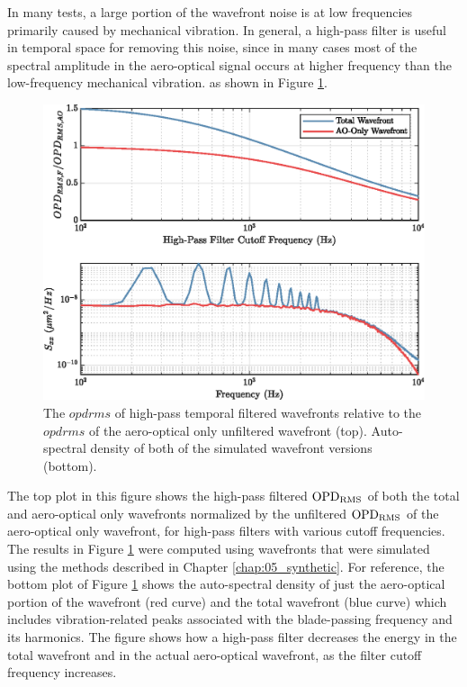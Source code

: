 In many tests, a large portion of the wavefront noise is at low frequencies primarily caused by mechanical vibration.
In general, a high-pass filter is useful in temporal space for removing this noise, since in many cases most of the spectral amplitude in the aero-optical signal occurs at higher frequency than the low-frequency mechanical vibration. as shown in Figure \ref{fig:06_filter_temporal}.
\begin{figure}
 \centering
 \includegraphics{../matlab/06_single_sensor_filtering/filter_temporal.eps}
 \caption{The $opdrms$ of high-pass temporal filtered wavefronts relative to the $opdrms$ of the aero-optical only unfiltered wavefront (top). Auto-spectral density of both of the simulated wavefront versions (bottom).}
 \label{fig:06_filter_temporal}
\end{figure}
The top plot in this figure shows the high-pass filtered $\operatorname{OPD_{RMS}}$ of both the total and aero-optical only wavefronts normalized by the unfiltered $\operatorname{OPD_{RMS}}$ of the aero-optical only wavefront, for high-pass filters with various cutoff frequencies.
The results in Figure \ref{fig:06_filter_temporal} were computed using wavefronts that were simulated using the methods described in Chapter \ref{chap:05_synthetic}.
For reference, the bottom plot of Figure \ref{fig:06_filter_temporal} shows the auto-spectral density of just the aero-optical portion of the wavefront (red curve) and the total wavefront (blue curve) which includes vibration-related peaks associated with the blade-passing frequency and its harmonics.
The figure shows how a high-pass filter decreases the energy in the total wavefront and in the actual aero-optical wavefront, as the filter cutoff frequency increases.
